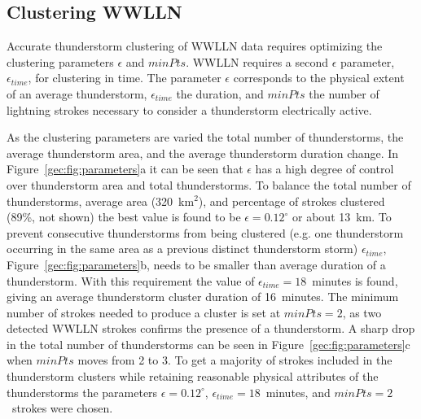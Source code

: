 \subsection{Clustering WWLLN}

Accurate thunderstorm clustering of WWLLN data requires optimizing the clustering parameters $\epsilon$ and $minPts$.
WWLLN requires a second $\epsilon$ parameter, $\epsilon_{time}$, for clustering in time.
The parameter $\epsilon$ corresponds to the physical extent of an average thunderstorm, $\epsilon_{time}$ the duration, and $minPts$ the number of lightning strokes necessary to consider a thunderstorm electrically active.

As the clustering parameters are varied the total number of thunderstorms, the average thunderstorm area, and the average thunderstorm duration change.
In Figure~\ref{gec:fig:parameters}a it can be seen that $\epsilon$ has a high degree of control over thunderstorm area and total thunderstorms.
To balance the total number of thunderstorms, average area (320~km$^2$), and percentage of strokes clustered (89\%, not shown) the best value is found to be $\epsilon = 0.12^\circ$ or about 13~km.
To prevent consecutive thunderstorms from being clustered (e.g. one thunderstorm occurring in the same area as a previous distinct thunderstorm storm) $\epsilon_{time}$, Figure~\ref{gec:fig:parameters}b, needs to be smaller than average duration of a thunderstorm.
With this requirement the value of $\epsilon_{time} = 18$~minutes is found, giving an average thunderstorm cluster duration of 16~minutes.
The minimum number of strokes needed to produce a cluster is set at $minPts = 2$, as two detected WWLLN strokes confirms the presence of a thunderstorm.
A sharp drop in the total number of thunderstorms can be seen in Figure~\ref{gec:fig:parameters}c when $minPts$ moves from 2 to 3.
To get a majority of strokes included in the thunderstorm clusters while retaining reasonable physical attributes of the thunderstorms the parameters $\epsilon = 0.12^\circ$, $\epsilon_{time} = 18$~minutes, and $minPts = 2$~strokes were chosen.

